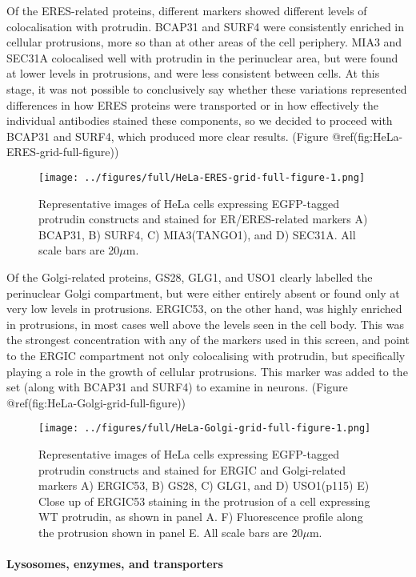 \documentclass[
]{article}
\begin{document}
Of the ERES-related proteins, different markers showed different levels
of colocalisation with protrudin. BCAP31 and SURF4 were consistently
enriched in cellular protrusions, more so than at other areas of the
cell periphery. MIA3 and SEC31A colocalised well with protrudin in the
perinuclear area, but were found at lower levels in protrusions, and
were less consistent between cells. At this stage, it was not possible
to conclusively say whether these variations represented differences in
how ERES proteins were transported or in how effectively the individual
antibodies stained these components, so we decided to proceed with
BCAP31 and SURF4, which produced more clear results. (Figure
@ref(fig:HeLa-ERES-grid-full-figure))

\begin{figure}
\centering
\texttt{[image: ../figures/full/HeLa-ERES-grid-full-figure-1.png]}
\caption{Representative images of HeLa cells expressing EGFP-tagged
protrudin constructs and stained for ER/ERES-related markers A) BCAP31,
B) SURF4, C) MIA3(TANGO1), and D) SEC31A. All scale bars are
20\(\mu\)m.}
\end{figure}

Of the Golgi-related proteins, GS28, GLG1, and USO1 clearly labelled the
perinuclear Golgi compartment, but were either entirely absent or found
only at very low levels in protrusions. ERGIC53, on the other hand, was
highly enriched in protrusions, in most cases well above the levels seen
in the cell body. This was the strongest concentration with any of the
markers used in this screen, and point to the ERGIC compartment not only
colocalising with protrudin, but specifically playing a role in the
growth of cellular protrusions. This marker was added to the set (along
with BCAP31 and SURF4) to examine in neurons. (Figure
@ref(fig:HeLa-Golgi-grid-full-figure))

\begin{figure}
\centering
\texttt{[image: ../figures/full/HeLa-Golgi-grid-full-figure-1.png]}
\caption{Representative images of HeLa cells expressing EGFP-tagged
protrudin constructs and stained for ERGIC and Golgi-related markers A)
ERGIC53, B) GS28, C) GLG1, and D) USO1(p115) E) Close up of ERGIC53
staining in the protrusion of a cell expressing WT protrudin, as shown
in panel A. F) Fluorescence profile along the protrusion shown in panel
E. All scale bars are 20\(\mu\)m.}
\end{figure}

\hypertarget{lysosomes-enzymes-and-transporters}{%
\paragraph{Lysosomes, enzymes, and
transporters}\label{lysosomes-enzymes-and-transporters}}
\end{document}
